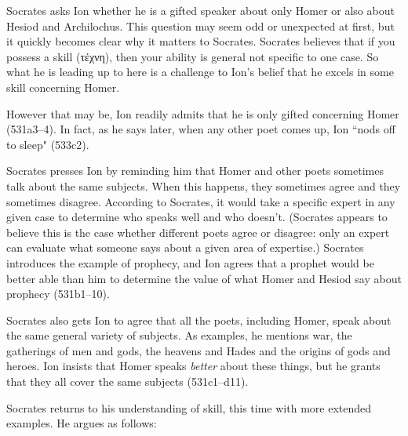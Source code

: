 \documentclass[11pt,letterpaper]{article}
\begin{document}
Socrates asks Ion whether he is a gifted speaker about only Homer or also about Hesiod and Archilochus. This question may seem odd or unexpected at first, but it quickly becomes clear why it matters to Socrates. Socrates believes that if you possess a skill (\textgreek{τέχνη}), then your ability is general not specific to one case. So what he is leading up to here is a challenge to Ion's belief that he excels in some skill concerning Homer.

However that may be, Ion readily admits that he is only gifted concerning Homer (531a3--4). In fact, as he says later, when any other poet comes up, Ion ``nods off to sleep" (533c2).

Socrates presses Ion by reminding him that Homer and other poets sometimes talk about the same subjects. When this happens, they sometimes agree and they sometimes disagree. According to Socrates, it would take a specific expert in any given case to determine who speaks well and who doesn't. (Socrates appears to believe this is the case whether different poets agree or disagree: only an expert can evaluate what someone says about a given area of expertise.) Socrates introduces the example of prophecy, and Ion agrees that a prophet would be better able than him to determine the value of what Homer and Hesiod say about prophecy (531b1--10).

Socrates also gets Ion to agree that all the poets, including Homer, speak about the same general variety of subjects. As examples, he mentions war, the gatherings of men and gods, the heavens and Hades and the origins of gods and heroes. Ion insists that Homer speaks \emph{better} about these things, but he grants that they all cover the same subjects (531c1--d11).

Socrates returns to his understanding of skill, this time with more extended examples. He argues as follows:
\end{document}
